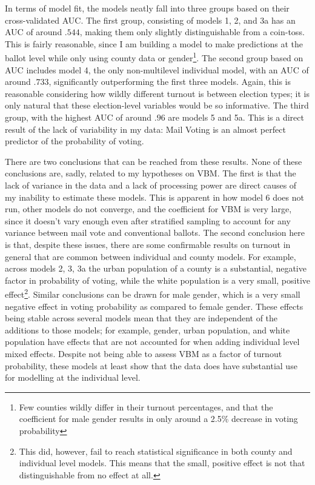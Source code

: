 \documentclass[12pt,twoside]{reedthesis}
\begin{document}
  In terms of model fit, the models neatly fall into three groups based on
  their cross-validated AUC. The first group, consisting of models 1, 2,
  and 3a has an AUC of around \(.544\), making them only slightly
  distinguishable from a coin-toss. This is fairly reasonable, since I am
  building a model to make predictions at the ballot level while only
  using county data or gender\footnote{Few counties wildly differ in their
    turnout percentages, and that the coefficient for male gender results
    in only around a 2.5\% decrease in voting probability}. The second
  group based on AUC includes model 4, the only non-multilevel individual
  model, with an AUC of around \(.733\), significantly outperforming the
  first three models. Again, this is reasonable considering how wildly
  different turnout is between election types; it is only natural that
  these election-level variables would be so informative. The third group,
  with the highest AUC of around \(.96\) are models 5 and 5a. This is a
  direct result of the lack of variability in my data: Mail Voting is an
  almost perfect predictor of the probability of voting.
  
  There are two conclusions that can be reached from these results. None
  of these conclusions are, sadly, related to my hypotheses on VBM. The
  first is that the lack of variance in the data and a lack of processing
  power are direct causes of my inability to estimate these models. This
  is apparent in how model 6 does not run, other models do not converge,
  and the coefficient for VBM is very large, since it doesn't vary enough
  even after stratified sampling to account for any variance between mail
  vote and conventional ballots. The second conclusion here is that,
  despite these issues, there are some confirmable results on turnout in
  general that are common between individual and county models. For
  example, across models 2, 3, 3a the urban population of a county is a
  substantial, negative factor in probability of voting, while the white
  population is a very small, positive effect\footnote{This did, however,
    fail to reach statistical significance in both county and individual
    level models. This means that the small, positive effect is not that
    distinguishable from no effect at all.}. Similar conclusions can be
  drawn for male gender, which is a very small negative effect in voting
  probability as compared to female gender. These effects being stable
  across several models mean that they are independent of the additions to
  those models; for example, gender, urban population, and white
  population have effects that are not accounted for when adding
  individual level mixed effects. Despite not being able to assess VBM as
  a factor of turnout probability, these models at least show that the
  data does have substantial use for modelling at the individual level.
  
\end{document}
